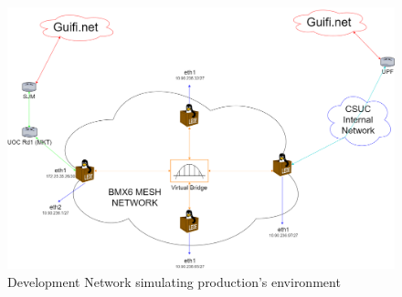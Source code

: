 \begin{landscape}

\begin{figure}[ht!]
        \centering
        \includegraphics[width=\hsize]{images/devnetfull}
        \caption{Development Network simulating production's environment}
        \label{fig:devnet}
	\end{figure}
\end{landscape}
\newpage

